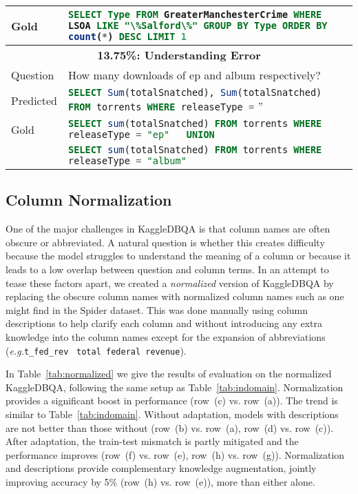 \documentclass[11pt,a4paper]{article}
\newcommand{\systemname}{\mbox{KaggleDBQA}\xspace}
\newcommand{\eg}{\textit{e.g.}\xspace}
\newcommand{\sql}[1]{\lstinline[language=SQL, basicstyle=\footnotesize\ttfamily]{#1}}
\begin{document}
\begin{table*}[t]
\begin{tabular}{lp{14.2cm}}
        Gold &  \sql{SELECT Type FROM GreaterManchesterCrime WHERE LSOA LIKE "\%Salford\%" GROUP BY Type ORDER BY count(*) DESC LIMIT 1} \\
        \midrule
        \multicolumn{2}{c}{\bfseries 13.75\%:  Understanding Error} \\
        Question  & How many downloads of ep and album respectively? \\
        Predicted &  \sql{SELECT Sum(totalSnatched), Sum(totalSnatched) FROM torrents WHERE releaseType =} '' \\
        Gold &   \sql{SELECT sum(totalSnatched) FROM torrents WHERE releaseType = "ep"   UNION} \\
        & \sql{SELECT sum(totalSnatched) FROM torrents WHERE releaseType = "album"}\\
        \bottomrule
\end{tabular}
\end{table*}

\subsection{Column Normalization}
One of the major challenges in \systemname is that column names are often obscure or abbreviated. A natural question is whether this creates difficulty because the model struggles to understand the meaning of a column or because it leads to a low overlap between question and column terms. In an attempt to tease these factors apart, we created a \textit{normalized} version of \systemname by replacing the obscure column names with normalized column names such as one might find in the Spider dataset. This was done manually using column descriptions to help clarify each column and without introducing any extra knowledge into the column names except for the expansion of abbreviations (\eg \texttt{t\_fed\_rev}~ \texttt{total federal revenue}). 




In Table~\ref{tab:normalized} we give the results of evaluation on the normalized \systemname, following the same setup as Table~\ref{tab:indomain}. Normalization provides a significant boost in performance (row~(c) vs. row~(a)).
The trend is similar to Table~\ref{tab:indomain}. Without adaptation, models with descriptions are not better than those without (row~(b) vs. row~(a), row~(d) vs. row~(c)). After adaptation, the train-test mismatch is partly mitigated and the performance improves (row~(f) vs. row~(e), row~(h) vs. row~(g)). Normalization and descriptions provide complementary knowledge augmentation, jointly improving accuracy by 5\% (row~(h) vs. row~(e)), more than either alone.
\end{document}
